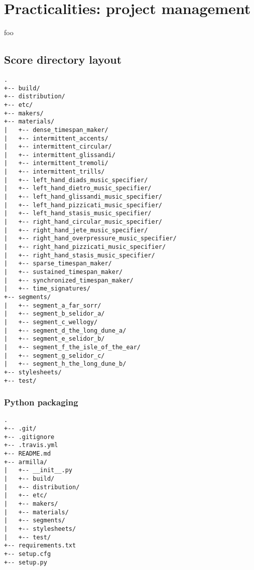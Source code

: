 \chapter{Practicalities: project management}

foo

\section{Score directory layout}

\begin{singlespacing}
\vspace{-0.5\baselineskip}
\begin{lstlisting}
.
+-- build/
+-- distribution/
+-- etc/
+-- makers/
+-- materials/
|   +-- dense_timespan_maker/
|   +-- intermittent_accents/
|   +-- intermittent_circular/
|   +-- intermittent_glissandi/
|   +-- intermittent_tremoli/
|   +-- intermittent_trills/
|   +-- left_hand_diads_music_specifier/
|   +-- left_hand_dietro_music_specifier/
|   +-- left_hand_glissandi_music_specifier/
|   +-- left_hand_pizzicati_music_specifier/
|   +-- left_hand_stasis_music_specifier/
|   +-- right_hand_circular_music_specifier/
|   +-- right_hand_jete_music_specifier/
|   +-- right_hand_overpressure_music_specifier/
|   +-- right_hand_pizzicati_music_specifier/
|   +-- right_hand_stasis_music_specifier/
|   +-- sparse_timespan_maker/
|   +-- sustained_timespan_maker/
|   +-- synchronized_timespan_maker/
|   +-- time_signatures/
+-- segments/
|   +-- segment_a_far_sorr/
|   +-- segment_b_selidor_a/
|   +-- segment_c_wellogy/
|   +-- segment_d_the_long_dune_a/
|   +-- segment_e_selidor_b/
|   +-- segment_f_the_isle_of_the_ear/
|   +-- segment_g_selidor_c/
|   +-- segment_h_the_long_dune_b/
+-- stylesheets/
+-- test/
\end{lstlisting}
\end{singlespacing}

\subsection{Python packaging}

\begin{singlespacing}
\vspace{-0.5\baselineskip}
\begin{lstlisting}
.
+-- .git/
+-- .gitignore
+-- .travis.yml
+-- README.md
+-- armilla/
|   +-- __init__.py
|   +-- build/
|   +-- distribution/
|   +-- etc/
|   +-- makers/
|   +-- materials/
|   +-- segments/
|   +-- stylesheets/
|   +-- test/
+-- requirements.txt
+-- setup.cfg
+-- setup.py
\end{lstlisting}
\end{singlespacing}

